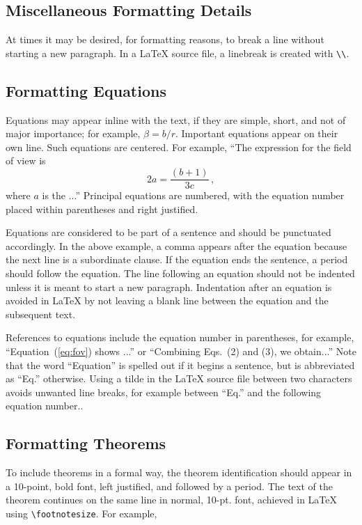 \documentclass[12pt]{spieman}  %
\begin{document}
\begin{spacing}{2}
\section{Miscellaneous Formatting Details}
\label{sect:misc}
At times it may be desired, for formatting reasons, to break a line without starting a new paragraph. In a LaTeX source file, a linebreak is created with \verb|\\|.


\subsection{Formatting Equations}
Equations may appear inline with the text, if they are simple, short, and not of major importance; for example, $\beta = b/r$.  Important equations appear on their own line.  Such equations are centered.  For example, ``The expression for the field of view is
\begin{equation}
\label{eq:fov}
2 a = \frac{(b + 1)}{3c} \, ,
\end{equation}
where $a$ is the ...''  Principal equations are numbered, with the equation number placed within parentheses and right justified.  

Equations are considered to be part of a sentence and should be punctuated accordingly. In the above example, a comma appears after the equation because the next line is a subordinate clause. If the equation ends the sentence, a period should follow the equation. The line following an equation should not be indented unless it is meant to start a new paragraph. Indentation after an equation is avoided in LaTeX by not leaving a blank line between the equation and the subsequent text.

References to equations include the equation number in parentheses, for example, ``Equation~(\ref{eq:fov}) shows ...'' or ``Combining Eqs.~(2) and (3), we obtain...'' Note that the word ``Equation'' is spelled out if it begins a sentence, but is abbreviated as ``Eq.'' otherwise. Using a tilde in the LaTeX source file between two characters avoids unwanted line breaks, for example between ``Eq.'' and the following equation number..

\subsection{Formatting Theorems}

To include theorems in a formal way, the theorem identification should appear in a 10-point, bold font, left justified, and followed by a period.  The text of the theorem continues on the same line in normal, 10-pt. font, achieved in LaTeX using \verb|\footnotesize|.  For example, 


\end{spacing}
\end{document}
